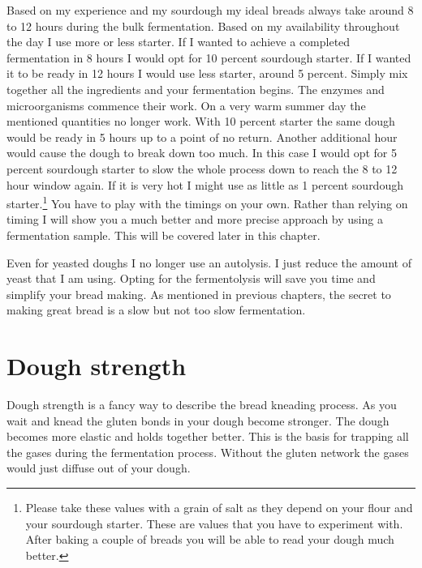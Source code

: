 Based on my experience and my sourdough my ideal breads always take around 8
to 12 hours during the bulk fermentation. Based on my availability throughout
the day I use more or less starter. If I wanted to achieve a completed
fermentation in 8 hours I would opt for 10 percent sourdough starter. If I
wanted it to be ready in 12 hours I would use less starter, around 5 percent.
Simply mix together all the ingredients and your fermentation begins. The
enzymes and microorganisms commence their work. On a very warm summer day the
mentioned quantities no longer work. With 10 percent starter the same dough
would be ready in 5 hours up to a point of no return. Another additional hour
would cause the dough to break down too much. In this case I would opt for 5
percent sourdough starter to slow the whole process down to reach the 8 to 12
hour window again. If it is very hot I might use as little as 1 percent
sourdough starter.\footnote{Please take these values with a grain of salt as
they depend on your flour and your sourdough starter. These are values that
you have to experiment with. After baking a couple of breads you will be able
to read your dough much better.} You have to play with the timings on your own.
Rather than relying on timing I will show you a much better and more precise approach
by using a fermentation sample. This will be covered later in this chapter.

Even for yeasted doughs I no longer use an autolysis. I just reduce the amount
of yeast that I am using. Opting for the fermentolysis will
save you time and simplify your bread making. As mentioned in previous chapters,
the secret to making great bread is a slow but not too slow fermentation.

\section{Dough strength}

Dough strength is a fancy way to describe the bread kneading process. As you wait and
knead the gluten bonds in your dough become stronger. The dough
becomes more elastic and holds together better. This is the basis for trapping
all the gases during the fermentation process. Without the gluten network
the gases would just diffuse out of your dough.

